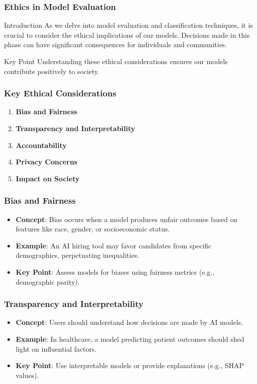 \documentclass[aspectratio=169]{beamer}
\begin{document}
\begin{frame}[fragile]
    \frametitle{Ethics in Model Evaluation}
    \begin{block}{Introduction}
        As we delve into model evaluation and classification techniques, it is crucial to consider the ethical implications of our models. Decisions made in this phase can have significant consequences for individuals and communities.
    \end{block}
    \begin{block}{Key Point}
        Understanding these ethical considerations ensures our models contribute positively to society.
    \end{block}
\end{frame}

\begin{frame}[fragile]
    \frametitle{Key Ethical Considerations}
    \begin{enumerate}
        \item \textbf{Bias and Fairness}
        \item \textbf{Transparency and Interpretability}
        \item \textbf{Accountability}
        \item \textbf{Privacy Concerns}
        \item \textbf{Impact on Society}
    \end{enumerate}
\end{frame}

\begin{frame}[fragile]
    \frametitle{Bias and Fairness}
    \begin{itemize}
        \item \textbf{Concept}: Bias occurs when a model produces unfair outcomes based on features like race, gender, or socioeconomic status.
        \item \textbf{Example}: An AI hiring tool may favor candidates from specific demographics, perpetuating inequalities.
        \item \textbf{Key Point}: Assess models for biases using fairness metrics (e.g., demographic parity).
    \end{itemize}
\end{frame}

\begin{frame}[fragile]
    \frametitle{Transparency and Interpretability}
    \begin{itemize}
        \item \textbf{Concept}: Users should understand how decisions are made by AI models.
        \item \textbf{Example}: In healthcare, a model predicting patient outcomes should shed light on influential factors.
        \item \textbf{Key Point}: Use interpretable models or provide explanations (e.g., SHAP values).
    \end{itemize}
\end{frame}
\end{document}
